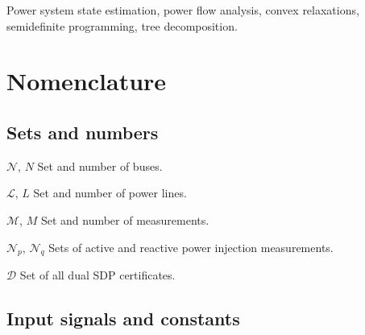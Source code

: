 \documentclass[journal,twoside]{IEEEtran}
\newcommand{\cL}{{\mathcal L}}
\newcommand{\cM}{{\mathcal M}}
\newcommand{\cN}{{\mathcal N}}
\begin{document}
\begin{IEEEkeywords}
Power system state estimation, power flow analysis, convex relaxations, semidefinite programming, tree decomposition.
\end{IEEEkeywords}



\section*{Nomenclature}


\subsection{Sets and numbers}

\begin{IEEEdescription}[\IEEEusemathlabelsep\IEEEsetlabelwidth{$\cN_p$, $\cN_q$}]

\item[$\cN$, $N$] Set and number of buses.
\item[$\cL$, $L$] Set and number of power lines.
\item[$\cM$, $M$] Set and number of measurements.
\item[$\cN_p$, $\cN_q$]  Sets of active and reactive power injection measurements.
\item[$\mathcal{D}$] Set of all dual SDP certificates.
\end{IEEEdescription}




\subsection{Input signals and constants}
\end{document}
